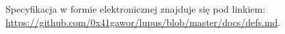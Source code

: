 \label{appendix:1}

Specyfikacja w formie elektronicznej znajduje się pod linkiem: \url{https://github.com/0x41gawor/lupus/blob/master/docs/defs.md}.